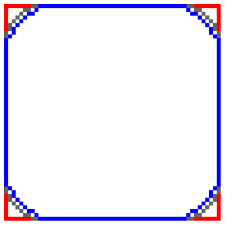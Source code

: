 \documentclass[smallextended]{svjour3}       %
\begin{document}
{\begin{figure}[hp!]
{{		\includegraphics[scale=0.15]{flow_grid-radius-effect_square_r3-h05_summary_flow.pdf}}%
		\hspace{15pt}
		}		
	

\end{figure}}
\end{document}
